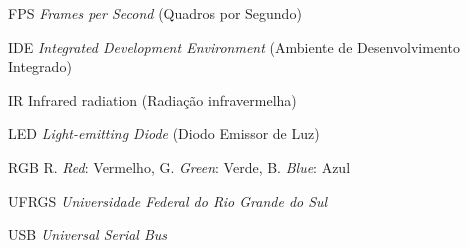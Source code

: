 %
%

\begin{siglas}
  \setlength{\baselineskip}{0.7\baselineskip}
  
  \item[FPS] \textit{Frames per Second} (Quadros por Segundo)
  \item[IDE] \textit{Integrated Development Environment} (Ambiente de Desenvolvimento Integrado)
  \item[IR] Infrared radiation (Radiação infravermelha)
  \item[LED] \textit{Light-emitting Diode} (Diodo Emissor de Luz)
  \item[RGB] R. \textit{Red}: Vermelho, G. \textit{Green}: Verde, B. \textit{Blue}: Azul
  \item[UFRGS] \textit{Universidade Federal do Rio Grande do Sul}
  \item[USB] \textit{Universal Serial Bus}
\end{siglas}
